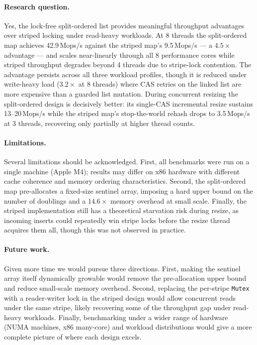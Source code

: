 \documentclass[11pt,a4paper]{article}
\begin{document}
\paragraph{Research question.}
Yes, the lock-free split-ordered list provides meaningful throughput advantages
over striped locking under read-heavy workloads. At 8 threads the split-ordered
map achieves 42.9\,Mops/s against the striped map's 9.5\,Mops/s --- a
$4.5\times$ advantage --- and scales near-linearly through all 8 performance
cores while striped throughput degrades beyond 4 threads due to stripe-lock
contention. The advantage persists across all three workload profiles, though
it is reduced under write-heavy load ($3.2\times$ at 8 threads) where CAS
retries on the linked list are more expensive than a guarded list mutation.
During concurrent resizing the split-ordered design is decisively better:
its single-CAS incremental resize sustains 13--20\,Mops/s while the striped
map's stop-the-world rehash drops to 3.5\,Mops/s at 3 threads, recovering
only partially at higher thread counts.

\paragraph{Limitations.}
Several limitations should be acknowledged. First, all benchmarks were run on
a single machine (Apple M4); results may differ on x86 hardware with different
cache coherence and memory ordering characteristics. Second, the split-ordered
map pre-allocates a fixed-size sentinel array, imposing a hard upper bound on
the number of doublings and a $14.6\times$ memory overhead at small scale. Finally, the striped implementation still has a theoretical starvation risk
during resize, as incoming inserts could repeatedly win stripe locks before the
resize thread acquires them all, though this was not observed in practice.

\paragraph{Future work.}
Given more time we would pursue three directions. First, making the sentinel
array itself dynamically growable would remove the pre-allocation upper bound
and reduce small-scale memory overhead. Second, replacing the per-stripe
\texttt{Mutex} with a reader-writer lock in the striped design would allow
concurrent reads under the same stripe, likely recovering some of the
throughput gap under read-heavy workloads. 
Finally, benchmarking under a wider range of hardware (NUMA machines, x86
many-core) and workload distributions would give a more complete picture of where each design excels.
\end{document}
